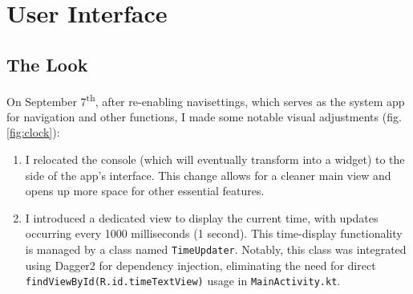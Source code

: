 {\color{teal!90}\chapter{User Interface}\label{cap:ui}}


\minitoc%


\section{The Look}


On September 7\textsuperscript{th}, after re-enabling \gls{navisettings}, which serves as the system app for navigation and other functions, I made some notable visual adjustments (fig. \ref{fig:clock}):

\begin{enumerate}
    \item I relocated the console (which will eventually transform into a widget) to the side of the app's interface. This change allows for a cleaner main view and opens up more space for other essential features.
    
    \item I introduced a dedicated view to display the current time, with updates occurring every 1000 milliseconds (1 second). This time-display functionality is managed by a class named \texttt{TimeUpdater}. Notably, this class was integrated using Dagger2 for dependency injection, eliminating the need for direct \texttt{findViewById(R.id.timeTextView)} usage in \texttt{MainActivity.kt}.
\end{enumerate}

